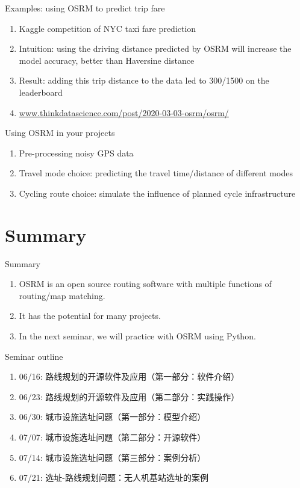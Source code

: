 \documentclass{beamer}
\begin{document}
\begin{frame}{Examples: using OSRM to predict trip fare}
\begin{enumerate}
\item Kaggle competition of NYC taxi fare prediction
\item Intuition: using the driving distance predicted by OSRM will increase the model accuracy, better than Haversine distance
\item Result: adding this trip distance to the data led to 300/1500 on the leaderboard
\item \url{www.thinkdatascience.com/post/2020-03-03-osrm/osrm/}
\end{enumerate}
\end{frame}

\begin{frame}{Using OSRM in your projects}
\begin{enumerate}
\item Pre-processing noisy GPS data 
\item Travel mode choice: predicting the travel time/distance of different modes
\item Cycling route choice: simulate the influence of planned cycle infrastructure
\end{enumerate}
\end{frame}

\section{Summary}
\begin{frame}{Summary}
\begin{enumerate}
\item OSRM is an open source routing software with multiple functions of routing/map matching.
\item It has the potential for many projects.
\item In the next seminar, we will practice with OSRM using Python.
\end{enumerate}
\end{frame}

\begin{frame}{Seminar outline}
\begin{enumerate}
\item 06/16: 路线规划的开源软件及应用（第一部分：软件介绍）
\item 06/23: 路线规划的开源软件及应用（第二部分：实践操作）
\item 06/30: 城市设施选址问题（第一部分：模型介绍）
\item 07/07: 城市设施选址问题（第二部分：开源软件）
\item 07/14: 城市设施选址问题（第三部分：案例分析）
\item 07/21: 选址-路线规划问题：无人机基站选址的案例
\end{enumerate}
\end{frame}
\end{document}
